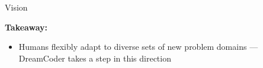 \documentclass{beamer}
\begin{document}
\begin{frame}{Vision}

  \textbf{Takeaway:}
  \begin{itemize}
    \item Humans flexibly adapt to diverse sets of new problem domains --- DreamCoder takes a step in this direction
  \end{itemize}
  \pause



  \end{frame}
\end{document}
